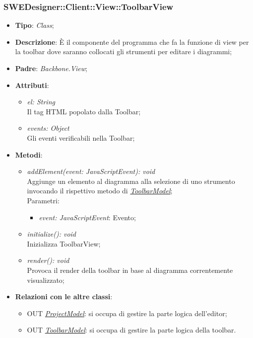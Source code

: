 \documentclass[../DefinizioneDiProdotto.tex]{subfiles}
\begin{document}
				\subsubsection{SWEDesigner::Client::View::ToolbarView}
					\hypertarget{SWEDesigner::Client::View::ToolbarView}{}
					\begin{itemize}
						\item \textbf{Tipo}: \emph{Class};
						\item \textbf{Descrizione}: È il componente del programma che fa la funzione di view per la toolbar dove saranno collocati gli strumenti per editare i diagrammi;
						\item \textbf{Padre}: \emph{Backbone.View};
						\item \textbf{Attributi}:
						\begin{itemize}
							\item \emph{el: String} \\
							Il tag HTML popolato dalla Toolbar;
							\item \emph{events: Object} \\
							Gli eventi verificabili nella Toolbar;
						\end{itemize}
						\item \textbf{Metodi}:
						\begin{itemize}
							\item \emph{addElement(event: JavaScriptEvent): void} \\
							Aggiunge un elemento al diagramma alla selezione di uno strumento invocando il rispettivo metodo di \hyperlink{SWEDesigner::Model::ToolbarModel}{\emph{ToolbarModel}}; \\
							Parametri:
							\begin{itemize}
								\item \emph{event: JavaScriptEvent}: Evento;
							\end{itemize}
							\item \emph{initialize(): void} \\
							Inizializza ToolbarView; 
							\item \emph{render(): void} \\
							Provoca il render della toolbar in base al diagramma correntemente visualizzato; 
						\end{itemize}
						\item \textbf{Relazioni con le altre classi}:
						\begin{itemize}
							\item OUT \hyperlink{SWEDesigner::Model::ProjectModel}{\emph{ProjectModel}}: si occupa di gestire la parte logica dell'editor;
							\item OUT \hyperlink{SWEDesigner::Model::ToolbarModel}{\emph{ToolbarModel}}: si occupa di gestire la parte logica della toolbar.
						\end{itemize}
					\end{itemize}
\end{document}
